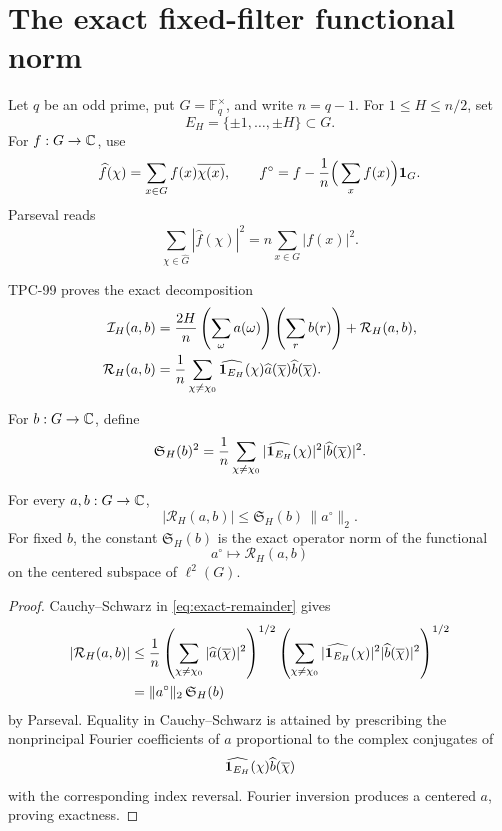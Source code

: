 \section{The exact fixed-filter functional norm}
\label{sec:fixed-filter}

Let \(q\) be an odd prime, put \(G=\mathbb F_q^\times\), and write
\(n=q-1\).  For \(1\le H\le n/2\), set
\[
 E_H=\{\pm1,\ldots,\pm H\}\subset G.
\]
For \(f:G\to\mathbb C\), use
\[
 \widehat f(\chi)
 =
 \sum_{x\in G}f(x)\overline{\chi(x)},\qquad
 f^\circ=f-\frac1n\Big(\sum_xf(x)\Big)\mathbf 1_G.
\]
Parseval reads
\[
 \sum_{\chi\in\widehat G}|\widehat f(\chi)|^2
 =
 n\sum_{x\in G}|f(x)|^2.
\]

TPC-99 proves the exact decomposition
\begin{align}
 \mathcal I_H(a,b)
 ={}&
 \frac{2H}{n}
 \left(\sum_\omega a(\omega)\right)
 \left(\sum_r b(r)\right)
 +\mathcal R_H(a,b),
\label{eq:principal-remainder}\\
 \mathcal R_H(a,b)
 ={}&
 \frac1n
 \sum_{\chi\ne\chi_0}
 \widehat{\mathbf 1_{E_H}}(\chi)
 \widehat a(\overline\chi)
 \widehat b(\overline\chi).
\label{eq:exact-remainder}
\end{align}

\begin{definition}
\label{def:fixed-filter-mass}
For \(b:G\to\mathbb C\), define
\begin{equation}
 \mathfrak S_H(b)^2
 =
 \frac1n
 \sum_{\chi\ne\chi_0}
 |\widehat{\mathbf 1_{E_H}}(\chi)|^2
 |\widehat b(\overline\chi)|^2.
\label{eq:fixed-filter-mass}
\end{equation}
\end{definition}

\begin{theorem}
\label{thm:exact-fixed-filter}
For every \(a,b:G\to\mathbb C\),
\begin{equation}
 |\mathcal R_H(a,b)|
 \le
 \mathfrak S_H(b)\,\|a^\circ\|_2.
\label{eq:exact-functional-bound}
\end{equation}
For fixed \(b\), the constant \(\mathfrak S_H(b)\) is the exact
operator norm of the functional
\[
 a^\circ\longmapsto\mathcal R_H(a,b)
\]
on the centered subspace of \(\ell^2(G)\).
\end{theorem}

\begin{proof}
Cauchy--Schwarz in \eqref{eq:exact-remainder} gives
\begin{align*}
 |\mathcal R_H(a,b)|
 &\le
 \frac1n
 \left(
 \sum_{\chi\ne\chi_0}
 |\widehat a(\overline\chi)|^2
 \right)^{1/2}
 \left(
 \sum_{\chi\ne\chi_0}
 |\widehat{\mathbf 1_{E_H}}(\chi)|^2
 |\widehat b(\overline\chi)|^2
 \right)^{1/2}\\
 &=\|a^\circ\|_2\,\mathfrak S_H(b)
\end{align*}
by Parseval.  Equality in Cauchy--Schwarz is attained by prescribing
the nonprincipal Fourier coefficients of \(a\) proportional to the
complex conjugates of
\[
 \widehat{\mathbf 1_{E_H}}(\chi)\widehat b(\overline\chi)
\]
with the corresponding index reversal.  Fourier inversion produces
a centered \(a\), proving exactness.
\end{proof}

